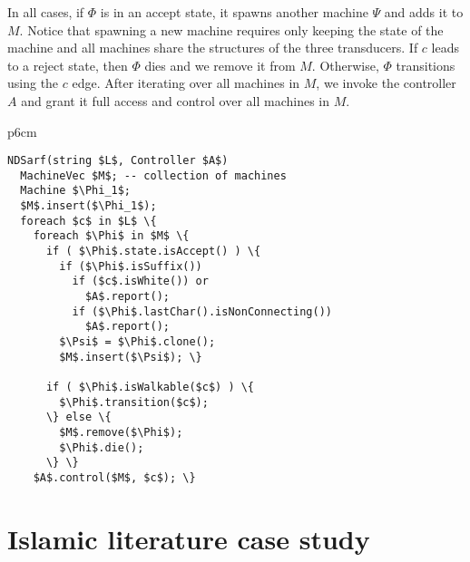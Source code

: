 \documentclass[11pt]{article}
\begin{document}
In all cases, if $\Phi$ is in an accept state, 
it spawns another machine $\Psi$ and adds it to $M$. 
Notice that spawning a new machine requires only keeping
the state of the machine and all machines share the
structures of the three transducers.
If $c$ leads to a reject state, then $\Phi$ dies 
and we remove it from $M$. 
Otherwise, $\Phi$ transitions using the $c$ edge.
After iterating over all machines in $M$, we invoke the 
controller $A$
and grant it full access and control over
all machines in $M$. 


\begin{table}[tb]
\begin{tabular} {p{6cm}}
\begin{Verbatim}[fontsize=\relsize{-2},
frame=topline,framesep=4mm,label=\fbox{NDSarf algorithm},
commandchars=\\\{\}, codes={\catcode`$=3\catcode`_=8}]
NDSarf(string $L$, Controller $A$) 
  MachineVec $M$; -- collection of machines
  Machine $\Phi_1$;
  $M$.insert($\Phi_1$);
  foreach $c$ in $L$ \{
    foreach $\Phi$ in $M$ \{
      if ( $\Phi$.state.isAccept() ) \{
        if ($\Phi$.isSuffix())
          if ($c$.isWhite()) or 
            $A$.report();
          if ($\Phi$.lastChar().isNonConnecting())
            $A$.report();
        $\Psi$ = $\Phi$.clone();
        $M$.insert($\Psi$); \}

      if ( $\Phi$.isWalkable($c$) ) \{
        $\Phi$.transition($c$);
      \} else \{
        $M$.remove($\Phi$);
        $\Phi$.die();
      \} \} 
    $A$.control($M$, $c$); \}
\end{Verbatim}
\end{tabular}
\label{a:ndsarf}
\end{table}

\section{Islamic literature case study}
\label{sec:islamic}
\end{document}
